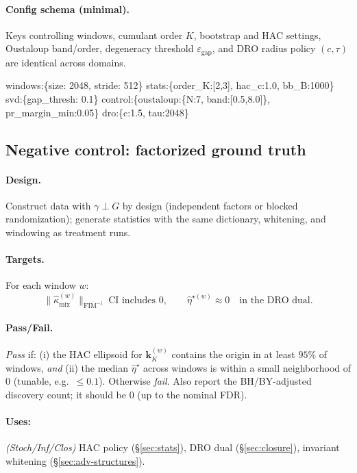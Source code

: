 \documentclass[10pt]{article}
\newcommand{\FIM}{\mathrm{FIM}}
\begin{document}
\paragraph{Config schema (minimal).} Keys controlling windows, cumulant order $K$, bootstrap and HAC settings, Oustaloup band/order, degeneracy threshold $\varepsilon_{\mathrm{gap}}$, and DRO radius policy $(c,\tau)$ are identical across domains.

\begin{mdframed}\small\ttfamily
windows:\{size: 2048, stride: 512\}\quad
stats:\{order\_K:[2,3], hac\_c:1.0, bb\_B:1000\}\quad
svd:\{gap\_thresh: 0.1\}\quad
control:\{oustaloup:\{N:7, band:[0.5,8.0]\}, pr\_margin\_min:0.05\}\quad
dro:\{c:1.5, tau:2048\}
\end{mdframed}

\subsection{Negative control: factorized ground truth}\label{subsec:neg-control}

\paragraph{Design.} Construct data with $\gamma\perp G$ by design (independent factors or blocked randomization); generate statistics with the same dictionary, whitening, and windowing as treatment runs.

\paragraph{Targets.} For each window $w$:
\[
\|\widehat\kappa_{\mathrm{mix}}^{(w)}\|_{\FIM^{-1}}\ \text{CI includes }0,\qquad
\widehat\eta^{\star (w)}\approx 0\quad \text{in the DRO dual.}
\]

\paragraph{Pass/Fail.} \emph{Pass} if: (i) the HAC ellipsoid for $\mathbf k_K^{(w)}$ contains the origin in at least $95\%$ of windows, \emph{and} (ii) the median $\widehat\eta^\star$ across windows is within a small neighborhood of $0$ (tunable, e.g.\ $\le 0.1$). Otherwise \emph{fail}. Also report the BH/BY-adjusted discovery count; it should be $0$ (up to the nominal FDR).

\paragraph{Uses:} \textit{(Stoch/Inf/Clos)} HAC policy (§\ref{sec:stats}), DRO dual (§\ref{sec:closure}), invariant whitening (§\ref{sec:adv-structures}).
\end{document}
